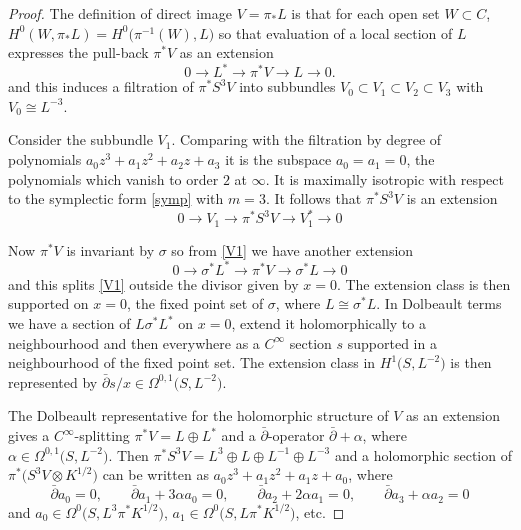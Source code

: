 \documentclass[11pt]{article}
\numberwithin{equation}{section}
\begin{document}
\begin{proof} The definition of direct image $V=\pi_*L$ is that for each open set $W\subset C$, $H^0(W, \pi_*L)=H^0\big(\pi^{-1}(W), L\big)$ so that evaluation of a local section of $L$ expresses the pull-back $\pi^*V$ as an extension{\samepage
\begin{equation}
0\rightarrow L^*\rightarrow \pi^*V\rightarrow L\rightarrow 0.
\label{V1}
\end{equation}
and this induces a filtration of $\pi^*S^3V$ into subbundles $V_0\subset V_1\subset V_2\subset V_3$ with $V_0\cong L^{-3}$.}

Consider the subbundle $V_1$. Comparing with the filtration by degree of polynomials $a_0z^3+a_1z^{2}+a_2z+a_3$ it is the subspace $a_0=a_{1}=0$, the polynomials which vanish to order $2$ at $\infty$. It is maximally isotropic with respect to the symplectic form \eqref{symp} with $m=3$.
It follows that $\pi^*S^3V$ is an extension
\begin{equation}
0\rightarrow V_1\rightarrow \pi^*S^3V\rightarrow V_1^*\rightarrow 0
\label{ext}
\end{equation}

Now $\pi^*V$ is invariant by $\sigma$ so from \eqref{V1} we have another extension
\begin{displaymath}0\rightarrow \sigma^*L^*\rightarrow \pi^*V\rightarrow \sigma^*L\rightarrow 0\end{displaymath}
and this splits \eqref{V1} outside the divisor given by $x=0$. The extension class is then supported on $x=0$, the fixed point set of $\sigma$, where $L\cong \sigma^*L$. In Dolbeault terms
we have a section of $L\sigma^*L^*$ on $x=0$, extend it holomorphically to a neighbourhood and then everywhere as a $C^{\infty}$ section $s$ supported in a neighbourhood of the fixed point set. The extension class in $H^1\big(S,L^{-2}\big)$ is then represented by $\bar\partial s/x\in \Omega^{0,1}\big(S, L^{-2}\big)$.

The Dolbeault representative for the holomorphic structure of $V$ as an extension gives a $C^{\infty}$-splitting $\pi^*V=L\oplus L^*$ and a $\bar\partial $-operator $\bar\partial +\alpha$, where $\alpha\in \Omega^{0,1}\big(S, L^{-2}\big)$. Then $\pi^*S^3V=L^{3}\oplus L\oplus L^{-1}\oplus L^{-3}$ and a holomorphic section of $\pi^*\big(S^3V\otimes K^{1/2}\big)$ can be written as $a_0z^3+a_1z^{2}+a_1z+a_0$, where
\begin{displaymath}\bar\partial a_0=0,\qquad \bar\partial a_1+3\alpha a_0=0,\qquad \bar\partial a_2+2\alpha a_1=0, \qquad \bar\partial a_3+\alpha a_2=0\end{displaymath}
and $a_0\in \Omega^0\big(S, L^3\pi^*K^{1/2}\big)$, $a_1\in \Omega^0\big(S, L\pi^*K^{1/2}\big)$, etc.


\end{proof}
\end{document}

